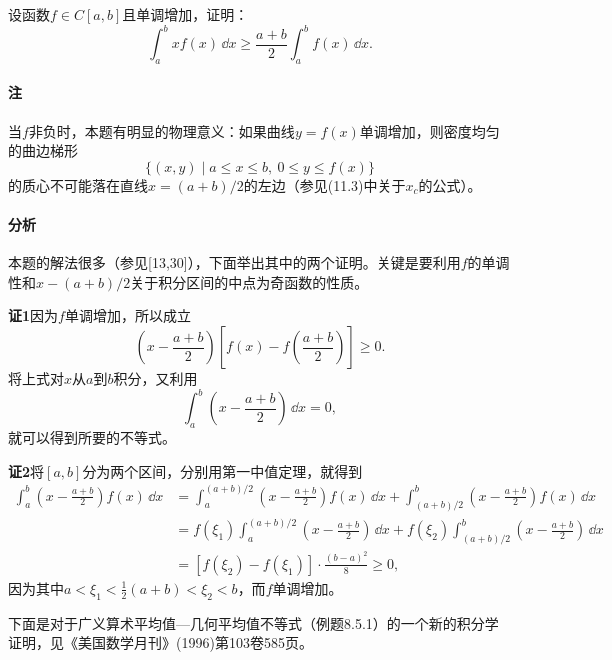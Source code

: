 \begin{xexample}[11.2.5]
设函数$f\in C[a,b]$且单调增加，证明：
\[
  \int_a^bxf(x)\,\dd x\ge\frac{a+b}{2}\int_a^bf(x)\,\dd x.
\]
\end{xexample}
\paragraph{注} 当$f$非负时，本题有明显的物理意义：如果曲线$y=f(x)$单调增加，则密度均匀的曲边梯形
\[
  \{(x,y)\mid a\le x\le b,\ 0\le y\le f(x)\}
\]
的质心不可能落在直线$x=(a+b)/2$的左边（参见(11.3)中关于$x_c$的公式）。

\paragraph{分析} 本题的解法很多（参见[13,30]），下面举出其中的两个证明。关键是要利用$f$的单调性和$x-(a+b)/2$关于积分区间的中点为奇函数的性质。

\begin{xproof}
\textbf{证1}\quad 因为$f$单调增加，所以成立
\begin{equation}
  \left(x-\frac{a+b}{2}\right)\left[f(x)-f\left(\frac{a+b}{2}\right)\right]\ge0.
  \tag{11.15}
  \label{eq:11.15}
\end{equation}
将上式对$x$从$a$到$b$积分，又利用
\[
  \int_a^b\left(x-\frac{a+b}{2}\right)\,\dd x=0,
\]
就可以得到所要的不等式。

\textbf{证2}\quad 将$[a,b]$分为两个区间，分别用第一中值定理，就得到
\begin{align*}
\int_a^b\left(x-\frac{a+b}{2}\right)f(x)\,\dd x
&=\int_a^{(a+b)/2}\left(x-\frac{a+b}{2}\right)f(x)\,\dd x
 +\int_{(a+b)/2}^b\left(x-\frac{a+b}{2}\right)f(x)\,\dd x\\
&=f(\xi_1)\int_a^{(a+b)/2}\left(x-\frac{a+b}{2}\right)\,\dd x
 +f(\xi_2)\int_{(a+b)/2}^b\left(x-\frac{a+b}{2}\right)\,\dd x\\
&=[f(\xi_2)-f(\xi_1)]\cdot\frac{(b-a)^2}{8}\ge0,
\end{align*}
因为其中$a<\xi_1<\frac12(a+b)<\xi_2<b$，而$f$单调增加。
\end{xproof}

下面是对于广义算术平均值—几何平均值不等式（例题8.5.1）的一个新的积分学证明，见《美国数学月刊》(1996)第103卷585页。


